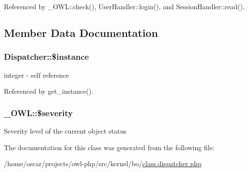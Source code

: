 Referenced by \_\-OWL::check(), UserHandler::login(), and SessionHandler::read().



\subsection{Member Data Documentation}
\subsubsection[{\$instance}]{\setlength{\rightskip}{0pt plus 5cm}Dispatcher::\$instance}\label{classDispatcher_a676b77546f23eb5bae93d28362664eb8}
integer -\/ self reference 

Referenced by get\_\-instance().

\subsubsection[{\$severity}]{\setlength{\rightskip}{0pt plus 5cm}\_\-OWL::\$severity}\label{class__OWL_ad26b40a9dbbacb33e299b17826f8327c}
Severity level of the current object status 

The documentation for this class was generated from the following file:\begin{DoxyCompactItemize}
\item 
/home/oscar/projects/owl-\/php/src/kernel/bo/\hyperlink{class_8dispatcher_8php}{class.dispatcher.php}\end{DoxyCompactItemize}

